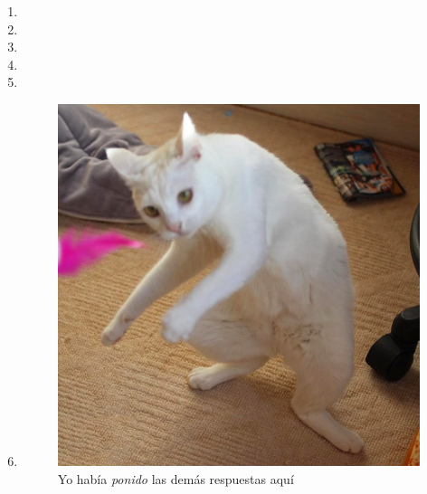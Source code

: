 \documentclass[11pt,letterpaper]{report}
\begin{document}
\begin{enumerate}
Sea $X$ la v.a. que denota el número de autos que atraviesan la caseta por hora.\\
Teniendo así $X \sim Poi(960)$.

Entonces lo que buscamos es $P(X>=1000)$, como no es \emph{fácil} de calcular por medios convencionales,
usaré una calculadora\footnote{\url{https://stattrek.com/online-calculator/poisson.aspx}}.

Por lo tanto $P(X\geq1000)=0.10175$

\item \faFrownO

\item \faFrownO

\item \faFrownO

\item \faFrownO

\item \faFrownO

\item \faFrownO

\begin{figure}[H]
    \centering
    \includegraphics[scale=0.22]{ponido.jpg}
    \caption{Yo había \textit{ponido} las demás respuestas aquí \faFrownO}
\end{figure}


\end{enumerate}
\end{document}

